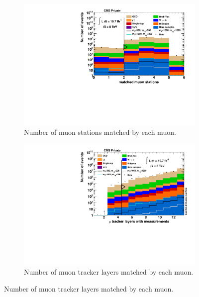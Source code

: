\begin{figure}[!htbp]
  \ContinuedFloat
  \centering
  \begin{subfigure}[b]{0.495\textwidth}
    \centering
    \includegraphics[width=\textwidth]{plots/nMuon_StationsMatched.pdf}
    \caption{Number of muon stations matched by each muon.\label{fig:muo_hits}}
  \end{subfigure}
  \begin{subfigure}[b]{0.495\textwidth}
    \centering
    \includegraphics[width=\textwidth]{plots/nMuon_TrackerLayers.pdf}
    \caption{Number of muon tracker layers matched by each muon.\label{fig:muo_stationsmatched}}
  \end{subfigure}
\end{figure}

